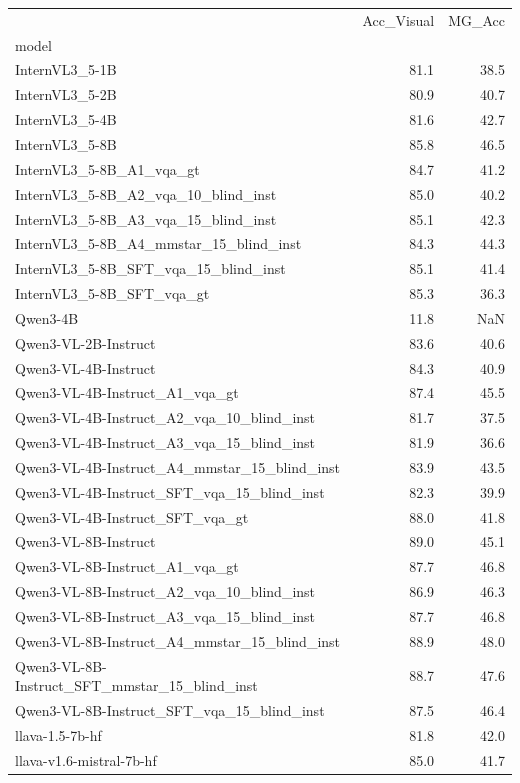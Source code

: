 \begin{tabular}{lrr}
\toprule
 & Acc_Visual & MG_Acc \\
model &  &  \\
\midrule
InternVL3_5-1B & 81.1 & 38.5 \\
InternVL3_5-2B & 80.9 & 40.7 \\
InternVL3_5-4B & 81.6 & 42.7 \\
InternVL3_5-8B & 85.8 & 46.5 \\
InternVL3_5-8B_A1_vqa_gt & 84.7 & 41.2 \\
InternVL3_5-8B_A2_vqa_10_blind_inst & 85.0 & 40.2 \\
InternVL3_5-8B_A3_vqa_15_blind_inst & 85.1 & 42.3 \\
InternVL3_5-8B_A4_mmstar_15_blind_inst & 84.3 & 44.3 \\
InternVL3_5-8B_SFT_vqa_15_blind_inst & 85.1 & 41.4 \\
InternVL3_5-8B_SFT_vqa_gt & 85.3 & 36.3 \\
Qwen3-4B & 11.8 & NaN \\
Qwen3-VL-2B-Instruct & 83.6 & 40.6 \\
Qwen3-VL-4B-Instruct & 84.3 & 40.9 \\
Qwen3-VL-4B-Instruct_A1_vqa_gt & 87.4 & 45.5 \\
Qwen3-VL-4B-Instruct_A2_vqa_10_blind_inst & 81.7 & 37.5 \\
Qwen3-VL-4B-Instruct_A3_vqa_15_blind_inst & 81.9 & 36.6 \\
Qwen3-VL-4B-Instruct_A4_mmstar_15_blind_inst & 83.9 & 43.5 \\
Qwen3-VL-4B-Instruct_SFT_vqa_15_blind_inst & 82.3 & 39.9 \\
Qwen3-VL-4B-Instruct_SFT_vqa_gt & 88.0 & 41.8 \\
Qwen3-VL-8B-Instruct & 89.0 & 45.1 \\
Qwen3-VL-8B-Instruct_A1_vqa_gt & 87.7 & 46.8 \\
Qwen3-VL-8B-Instruct_A2_vqa_10_blind_inst & 86.9 & 46.3 \\
Qwen3-VL-8B-Instruct_A3_vqa_15_blind_inst & 87.7 & 46.8 \\
Qwen3-VL-8B-Instruct_A4_mmstar_15_blind_inst & 88.9 & 48.0 \\
Qwen3-VL-8B-Instruct_SFT_mmstar_15_blind_inst & 88.7 & 47.6 \\
Qwen3-VL-8B-Instruct_SFT_vqa_15_blind_inst & 87.5 & 46.4 \\
llava-1.5-7b-hf & 81.8 & 42.0 \\
llava-v1.6-mistral-7b-hf & 85.0 & 41.7 \\

\end{tabular}
